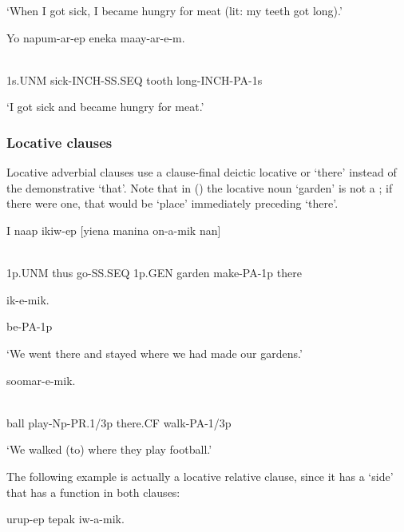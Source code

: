 `When I got sick, I became hungry for meat (lit: my teeth got long).'

\ea%
\label{ex:x1632}
\gll Yo  napum-ar-ep  eneka  maay-ar-e-m. \\
      \\
\glt
\z

1s.UNM  sick-INCH-SS.SEQ  tooth  long-INCH-PA-1s

`I got sick and became hungry for meat.'

\subsubsection[Locative clauses]{Locative clauses}
\hypertarget{RefHeading23661935131865}{}
Locative adverbial clauses use a clause-final deictic locative  or  `there' instead of the demonstrative   `that'. Note that in () the locative noun  `garden' is not a ; if there were one, that would be  `place' immediately preceding  `there'. 

\ea%
\label{ex:x1621}
\gll I  naap  ikiw-ep  [yiena  manina  on-a-mik  nan] \\
      \\
\glt
\z

1p.UNM  thus  go-SS.SEQ  1p.GEN  garden  make-PA-1p  there

ik-e-mik.

be-PA-1p

`We went there and stayed where we had made our gardens.'

\ea%
\label{ex:x1626}
  soomar-e-mik. \\
      \\
\glt
\z

ball  play-Np-PR.1/3p  there.CF  walk-PA-1/3p

`We walked (to) where they play football.'

The following example is actually a locative relative clause, since it has a   `side' that has a function in both clauses:

\ea%
\label{ex:x1638}
  urup-ep  tepak  iw-a-mik. \\
      \\
\glt
\z

